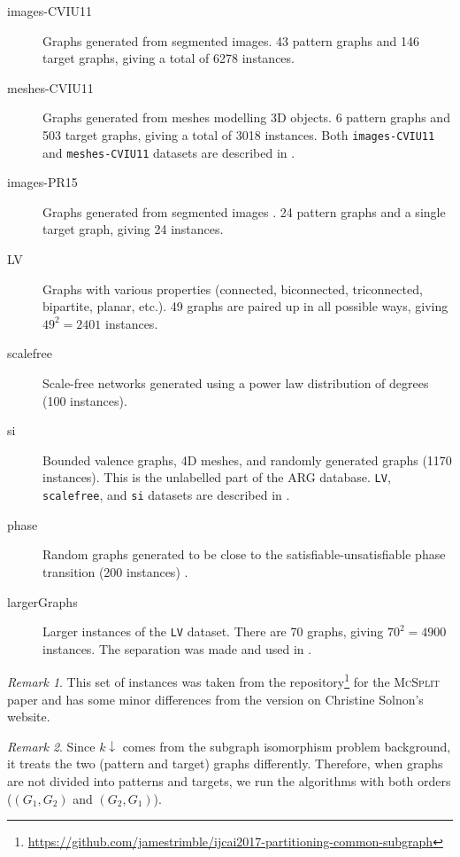\documentclass{l4proj}
\theoremstyle{definition}
\theoremstyle{remark}
\newtheorem{remark}{Remark}[section]
\begin{document}
\begin{description}
\item[images-CVIU11] Graphs generated from segmented images. 43 pattern graphs
  and 146 target graphs, giving a total of \num{6278} instances.
\item[meshes-CVIU11] Graphs generated from meshes modelling 3D
  objects. 6 pattern graphs and 503 target graphs, giving a total of \num{3018}
  instances. Both \texttt{images-CVIU11} and \texttt{meshes-CVIU11} datasets are
  described in \cite{DBLP:journals/cviu/DamiandSHJS11}.
\item[images-PR15] Graphs generated from segmented images
  \cite{DBLP:journals/pr/SolnonDHJ15}. 24 pattern graphs and a single target
  graph, giving 24 instances.
\item[LV] Graphs with various properties (connected, biconnected, triconnected,
  bipartite, planar, etc.). 49 graphs are paired up in all possible ways, giving
  $49^2=\num{2401}$ instances.
\item[scalefree] Scale-free networks generated using a power law distribution of
  degrees (100 instances).
\item[si] Bounded valence graphs, 4D meshes, and randomly generated graphs
  (\num{1170} instances). This is the unlabelled part of the ARG database.
  \texttt{LV}, \texttt{scalefree}, and \texttt{si} datasets are described in
  \cite{DBLP:journals/ai/Solnon10, DBLP:journals/constraints/ZampelliDS10}.
\item[phase] Random graphs generated to be close to the
  satisfiable-unsatisfiable phase transition (200 instances)
  \cite{DBLP:conf/ijcai/McCreeshPT16}.
\item[largerGraphs] Larger instances of the \texttt{LV} dataset. There are 70
  graphs, giving $70^2=\num{4900}$ instances. The separation was made and used
  in \cite{DBLP:conf/aaai/HoffmannMR17, DBLP:conf/lion/KotthoffMS16,
    DBLP:conf/ijcai/McCreeshPT17}.
\end{description}

\begin{remark}
This set of instances was taken from the
repository\footnote{\url{https://github.com/jamestrimble/ijcai2017-partitioning-common-subgraph}}
for the \textsc{McSplit} paper \cite{DBLP:conf/ijcai/McCreeshPT17} and has some
minor differences from the version on Christine Solnon's website.
\end{remark}

\begin{remark}
  Since $k\downarrow$ comes from the subgraph isomorphism problem background, it
  treats the two (pattern and target) graphs differently. Therefore, when graphs
  are not divided into patterns and targets, we run the algorithms with both
  orders ($(G_1, G_2)$ and $(G_2, G_1)$).
\end{remark}
\end{document}
